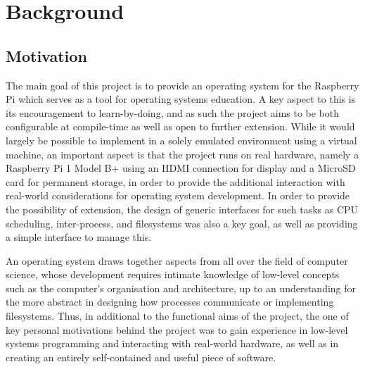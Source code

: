 \section{Background}
\subsection{Motivation}
    The main goal of this project is to provide an operating system for the
    Raspberry Pi which serves as a tool for operating systems education. A key
    aspect to this is its encouragement to learn-by-doing, and as such the
    project aims to be both configurable at compile-time as well as open to
    further extension. While it would largely be possible to implement in a
    solely emulated environment using a virtual machine, an important aspect is
    that the project runs on real hardware, namely a Raspberry Pi 1 Model B+
    using an HDMI connection for display and a MicroSD card for permanent
    storage, in order to provide the additional interaction with real-world
    considerations for operating system development. In order to provide the
    possibility of extension, the design of generic interfaces for such tasks as
    CPU scheduling, inter-process, and filesystems was also a key goal, as well
    as providing a simple interface to manage this.

    An operating system draws together aspects from all over the field of
    computer science, whose development requires intimate knowledge of low-level
    concepts such as the computer's organisation and architecture, up to an
    understanding for the more abstract in designing how processes communicate
    or implementing filesystems. Thus, in additional to the functional aims of
    the project, the one of key personal motivations behind the project was to
    gain experience in low-level systems programming and interacting with
    real-world hardware, as well as in creating an entirely self-contained and
    useful piece of software.

